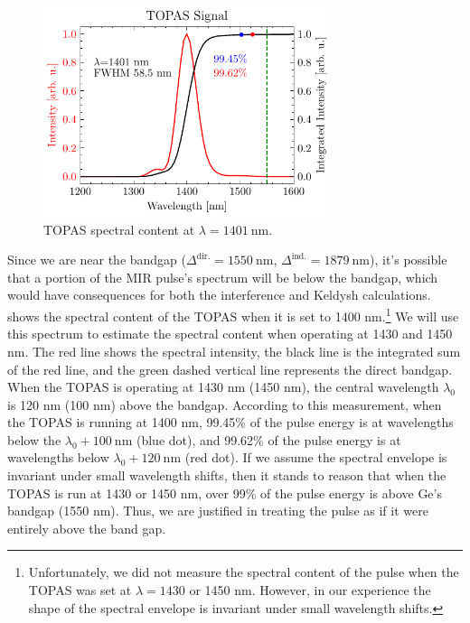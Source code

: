 \begin{figure}
	\centering
	\includegraphics[width=0.75\textwidth]{figures/chap4/TOPAS_1400nm_spectral_inten.pdf}
	\caption{TOPAS spectral content at $\lambda = 1401 \ \textrm{nm}$.}
	\label{fig:TOPAS_1400nm_spectral_inten}
\end{figure}

Since we are near the bandgap ($\Delta^{\textrm{dir.}} = 1550 \ \textrm{nm}$, $\Delta^{\textrm{ind.}} = 1879 \ \textrm{nm}$), it's possible that a portion of the MIR pulse's spectrum will be below the bandgap, which would have consequences for both the interference and Keldysh calculations.  shows the spectral content of the TOPAS when it is set to 1400 nm.\footnote{Unfortunately, we did not measure the spectral content of the pulse when the TOPAS was set at $\lambda = 1430$ or 1450 nm. However, in our experience the shape of the spectral envelope is invariant under small wavelength shifts.} We will use this spectrum to estimate the spectral content when operating at 1430 and 1450 nm. The red line shows the spectral intensity, the black line is the integrated sum of the red line, and the green dashed vertical line represents the direct bandgap. When the TOPAS is operating at 1430 nm (1450 nm), the central wavelength $\lambda_0$ is 120 nm (100 nm) above the bandgap. According to this measurement, when the TOPAS is running at 1400 nm, 99.45\% of the pulse energy is at wavelengths below the $\lambda_0 + 100 \ \textrm{nm}$ (blue dot), and 99.62\% of the pulse energy is at wavelengths below $\lambda_0 + 120 \ \textrm{nm}$ (red dot). If we assume the spectral envelope is invariant under small wavelength shifts, then it stands to reason that when the TOPAS is run at 1430 or 1450 nm, over 99\% of the pulse energy is above Ge's bandgap (1550 nm). Thus, we are justified in treating the pulse as if it were entirely above the band gap.


